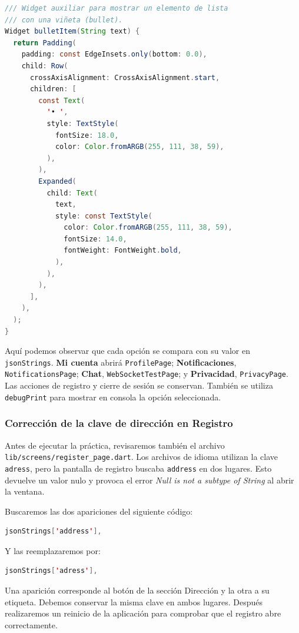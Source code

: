 \begin{lstlisting}[language=Java, caption={Código completo de custom\_widgets.dart}]
/// Widget auxiliar para mostrar un elemento de lista
/// con una viñeta (bullet).
Widget bulletItem(String text) {
  return Padding(
    padding: const EdgeInsets.only(bottom: 0.0),
    child: Row(
      crossAxisAlignment: CrossAxisAlignment.start,
      children: [
        const Text(
          '• ',
          style: TextStyle(
            fontSize: 18.0,
            color: Color.fromARGB(255, 111, 38, 59),
          ),
        ),
        Expanded(
          child: Text(
            text,
            style: const TextStyle(
              color: Color.fromARGB(255, 111, 38, 59),
              fontSize: 14.0,
              fontWeight: FontWeight.bold,
            ),
          ),
        ),
      ],
    ),
  );
}
\end{lstlisting}

Aquí podemos observar que cada opción se compara con su valor en \texttt{jsonStrings}. \textbf{Mi cuenta} abrirá \texttt{ProfilePage}; \textbf{Notificaciones}, \texttt{NotificationsPage}; \textbf{Chat}, \texttt{WebSocketTestPage}; y \textbf{Privacidad}, \texttt{PrivacyPage}. Las acciones de registro y cierre de sesión se conservan. También se utiliza \texttt{debugPrint} para mostrar en consola la opción seleccionada.

\subsubsection{Corrección de la clave de dirección en Registro}
Antes de ejecutar la práctica, revisaremos también el archivo \texttt{lib/screens/register\_page.dart}. Los archivos de idioma utilizan la clave \texttt{adress}, pero la pantalla de registro buscaba \texttt{address} en dos lugares. Esto devuelve un valor nulo y provoca el error \textit{Null is not a subtype of String} al abrir la ventana.

Buscaremos las dos apariciones del siguiente código:

\begin{lstlisting}[language=Java, caption={Clave que debemos corregir en Registro}]
jsonStrings['address'],
\end{lstlisting}

Y las reemplazaremos por:

\begin{lstlisting}[language=Java, caption={Clave utilizada por los archivos de idioma}]
jsonStrings['adress'],
\end{lstlisting}

Una aparición corresponde al botón de la sección Dirección y la otra a su etiqueta. Debemos conservar la misma clave en ambos lugares. Después realizaremos un reinicio de la aplicación para comprobar que el registro abre correctamente.

